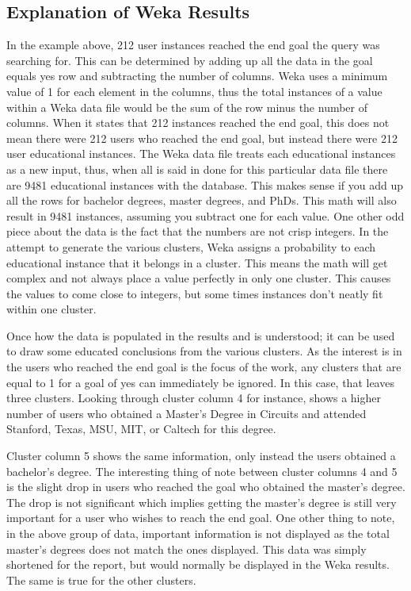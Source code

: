 \subsection{Explanation of Weka Results}
In the example above, 212 user instances reached the end goal the query was
searching for.  This can be determined by adding up all the data in the goal
equals yes row and subtracting the number of columns.  Weka uses a minimum value
of 1 for each element in the columns, thus the total instances of a value within
a Weka data file would be the sum of the row minus the number of columns.  When
it states that 212 instances reached the end goal, this does not mean there were
212 users who reached the end goal, but instead there were 212 user educational instances.
The Weka data file treats each educational instances as a new input, thus, when
all is said in done for this particular data file there are 9481 educational
instances with the database.  This makes sense if you add up all the rows for
bachelor degrees, master degrees, and PhDs.  This math will also result in 9481
instances, assuming you subtract one for each value.  One other odd piece about
the data is the fact that the numbers are not crisp integers.  In the attempt to
generate the various clusters, Weka assigns a probability to each educational
instance that it belongs in a cluster.  This means the math will get complex and
not always place a value perfectly in only one cluster.  This causes the values
to come close to integers, but some times instances don't neatly fit within one cluster.

Once how the data is populated in the results and is understood; it can be used
to draw some educated conclusions from the various clusters.  As the interest
is in the users who reached the end goal is the focus of the work, any clusters
that are equal to 1 for a goal of yes can immediately be ignored.  In this case,
that leaves three clusters.  Looking through cluster column 4 for instance,
shows a higher number of users who obtained a Master's Degree in Circuits and
attended Stanford, Texas, MSU, MIT, or Caltech for this degree.  

Cluster column 5 shows the same information, only instead the users obtained a
bachelor's degree.  The interesting thing of note between cluster columns 4 and
5 is the slight drop in users who reached the goal who obtained the master's degree. 
The drop is not significant which implies getting the master's degree is still
very important for a user who wishes to reach the end goal.  One other thing to note,
in the above group of data, important information is not displayed as the total
master's degrees does not match the ones displayed.  This data was simply
shortened for the report, but would normally be displayed in the Weka results. 
The same is true for the other clusters.  

